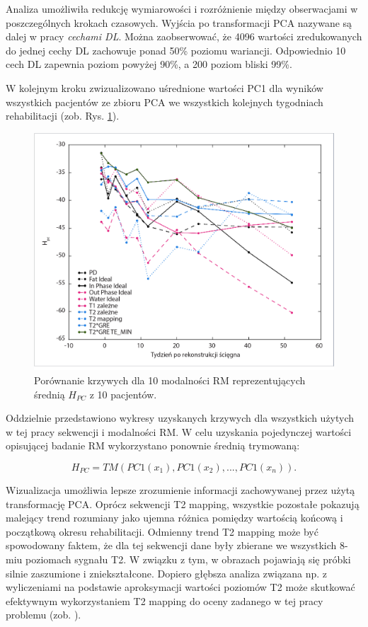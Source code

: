 Analiza umożliwiła redukcję wymiarowości i rozróżnienie między obserwacjami w poszczególnych krokach czasowych. Wyjścia po transformacji PCA nazywane \linebreak są dalej w pracy \textit{cechami DL}. Można zaobserwować, że 4096 wartości zredukowanych do jednej cechy DL zachowuje ponad 50\% poziomu wariancji. Odpowiednio 10 cech DL zapewnia poziom powyżej 90\%, a 200 poziom bliski 99\%. 

W kolejnym kroku zwizualizowano uśrednione wartości PC1 dla wyników wszystkich pacjentów ze zbioru PCA we wszystkich kolejnych tygodniach rehabilitacji (zob. Rys. \ref{fig:H}).

\begin{figure}[h!]
	\centering
	\includegraphics[width=1\textwidth]{figures/H_PC1.jpg}
	\caption{Porównanie krzywych dla 10 modalności RM reprezentujących średnią $H_{PC}$ z 10 pacjentów.}\label{fig:H}
\end{figure}
Oddzielnie przedstawiono wykresy uzyskanych krzywych dla wszystkich użytych w tej pracy sekwencji i modalności RM. W celu uzyskania pojedynczej wartości opisującej badanie RM wykorzystano ponownie średnią trymowaną:

\begin{equation}
\label{ecq:HPC}
H_{PC} = TM(PC1(x_1), PC1(x_2),..., PC1(x_n)).
\end{equation}

Wizualizacja umożliwia lepsze zrozumienie informacji zachowywanej przez użytą transformację PCA. Oprócz sekwencji T2 mapping, wszystkie pozostałe pokazują malejący trend rozumiany jako ujemna różnica pomiędzy wartością końcową i początkową okresu rehabilitacji. Odmienny trend T2 mapping może być spowodowany faktem, że dla tej sekwencji dane były zbierane we wszystkich 8-miu poziomach sygnału T2. W związku z tym, w obrazach pojawiają się próbki silnie zaszumione \linebreak i zniekształcone. Dopiero głębsza analiza związana np. z wyliczeniami na podstawie aproksymacji wartości poziomów T2 może skutkować efektywnym wykorzystaniem T2 mapping do oceny zadanego w tej pracy problemu (zob. \cite{Regulski2017}). 

